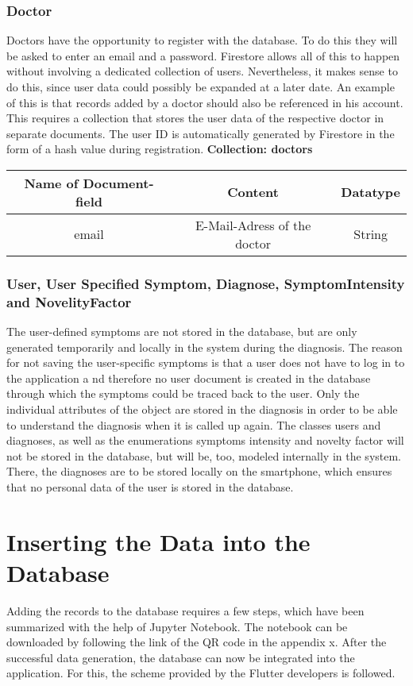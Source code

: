 \subsubsection{Doctor}
Doctors have the opportunity to register with the database. To do this they will be asked to enter an email and a password. Firestore allows all of this to happen without involving a dedicated collection of users. Nevertheless, it makes sense to do this, since user data could possibly be expanded at a later date. An example of this is that records added by a doctor should also be referenced in his account. This requires a collection that stores the user data of the respective doctor in separate documents. The user ID is automatically generated by Firestore in the form of a hash value during registration.
\textbf{Collection: doctors}
		\begin{center}
			\begin{tabular}{ | c| c| c | } 
  				\hline
  				Name of Document-field& Content & Datatype \\  
  				\hline
  				email & E-Mail-Adress of the doctor & String \\
  				\hline
			\end{tabular}
		\end{center}
\subsubsection{User, User Specified Symptom, Diagnose, SymptomIntensity and NovelityFactor}
The user-defined symptoms are not stored in the database, but are only generated temporarily and locally in the system during the diagnosis. The reason for not saving the user-specific symptoms is that a user does not have to log in to the application a
nd therefore no user document is created in the database through which the symptoms could be traced back to the user. Only the individual attributes of the object are stored in the diagnosis in order to be able to understand the diagnosis when it is called up again. The classes users and diagnoses, as well as the enumerations symptoms intensity and novelty factor will not be stored in the database, but will be, too, modeled internally in the system. There, the diagnoses are to be stored locally on the smartphone, which ensures that no personal data of the user is stored in the database.

\section{Inserting the Data into the Database}
Adding the records to the database requires a few steps, which have been summarized with the help of Jupyter Notebook. The notebook can be downloaded by following the link of the QR code in the appendix x. After the successful data generation, the database can now be integrated into the application. For this, the scheme provided by the Flutter developers is followed.